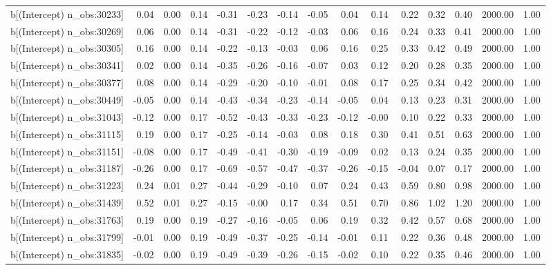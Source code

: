 \begin{table}[ht]
\begin{tabular}{rrrrrrrrrrrrrrr}
  b[(Intercept) n\_obs:30233] & 0.04 & 0.00 & 0.14 & -0.31 & -0.23 & -0.14 & -0.05 & 0.04 & 0.14 & 0.22 & 0.32 & 0.40 & 2000.00 & 1.00 \\ 
  b[(Intercept) n\_obs:30269] & 0.06 & 0.00 & 0.14 & -0.31 & -0.22 & -0.12 & -0.03 & 0.06 & 0.16 & 0.24 & 0.33 & 0.41 & 2000.00 & 1.00 \\ 
  b[(Intercept) n\_obs:30305] & 0.16 & 0.00 & 0.14 & -0.22 & -0.13 & -0.03 & 0.06 & 0.16 & 0.25 & 0.33 & 0.42 & 0.49 & 2000.00 & 1.00 \\ 
  b[(Intercept) n\_obs:30341] & 0.02 & 0.00 & 0.14 & -0.35 & -0.26 & -0.16 & -0.07 & 0.03 & 0.12 & 0.20 & 0.28 & 0.35 & 2000.00 & 1.00 \\ 
  b[(Intercept) n\_obs:30377] & 0.08 & 0.00 & 0.14 & -0.29 & -0.20 & -0.10 & -0.01 & 0.08 & 0.17 & 0.25 & 0.34 & 0.42 & 2000.00 & 1.00 \\ 
  b[(Intercept) n\_obs:30449] & -0.05 & 0.00 & 0.14 & -0.43 & -0.34 & -0.23 & -0.14 & -0.05 & 0.04 & 0.13 & 0.23 & 0.31 & 2000.00 & 1.00 \\ 
  b[(Intercept) n\_obs:31043] & -0.12 & 0.00 & 0.17 & -0.52 & -0.43 & -0.33 & -0.23 & -0.12 & -0.00 & 0.10 & 0.22 & 0.33 & 2000.00 & 1.00 \\ 
  b[(Intercept) n\_obs:31115] & 0.19 & 0.00 & 0.17 & -0.25 & -0.14 & -0.03 & 0.08 & 0.18 & 0.30 & 0.41 & 0.51 & 0.63 & 2000.00 & 1.00 \\ 
  b[(Intercept) n\_obs:31151] & -0.08 & 0.00 & 0.17 & -0.49 & -0.41 & -0.30 & -0.19 & -0.09 & 0.02 & 0.13 & 0.24 & 0.35 & 2000.00 & 1.00 \\ 
  b[(Intercept) n\_obs:31187] & -0.26 & 0.00 & 0.17 & -0.69 & -0.57 & -0.47 & -0.37 & -0.26 & -0.15 & -0.04 & 0.07 & 0.17 & 2000.00 & 1.00 \\ 
  b[(Intercept) n\_obs:31223] & 0.24 & 0.01 & 0.27 & -0.44 & -0.29 & -0.10 & 0.07 & 0.24 & 0.43 & 0.59 & 0.80 & 0.98 & 2000.00 & 1.00 \\ 
  b[(Intercept) n\_obs:31439] & 0.52 & 0.01 & 0.27 & -0.15 & -0.00 & 0.17 & 0.34 & 0.51 & 0.70 & 0.86 & 1.02 & 1.20 & 2000.00 & 1.00 \\ 
  b[(Intercept) n\_obs:31763] & 0.19 & 0.00 & 0.19 & -0.27 & -0.16 & -0.05 & 0.06 & 0.19 & 0.32 & 0.42 & 0.57 & 0.68 & 2000.00 & 1.00 \\ 
  b[(Intercept) n\_obs:31799] & -0.01 & 0.00 & 0.19 & -0.49 & -0.37 & -0.25 & -0.14 & -0.01 & 0.11 & 0.22 & 0.36 & 0.48 & 2000.00 & 1.00 \\ 
  b[(Intercept) n\_obs:31835] & -0.02 & 0.00 & 0.19 & -0.49 & -0.39 & -0.26 & -0.15 & -0.02 & 0.10 & 0.22 & 0.35 & 0.46 & 2000.00 & 1.00 \\ 

\end{tabular}
\end{table}
